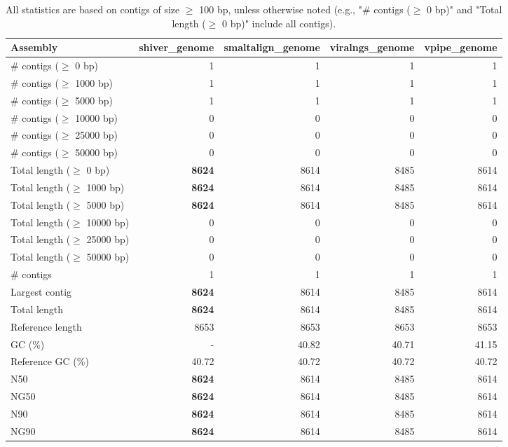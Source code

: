\documentclass[12pt,a4paper]{article}
\begin{document}
\begin{table}[ht]
\begin{center}
\caption{All statistics are based on contigs of size $\geq$ 100 bp, unless otherwise noted (e.g., "\# contigs ($\geq$ 0 bp)" and "Total length ($\geq$ 0 bp)" include all contigs).}
\begin{tabular}{|l*{4}{|r}|}
\hline
Assembly & shiver\_genome & smaltalign\_genome & viralngs\_genome & vpipe\_genome \\ \hline
\# contigs ($\geq$ 0 bp) & 1 & 1 & 1 & 1 \\ \hline
\# contigs ($\geq$ 1000 bp) & 1 & 1 & 1 & 1 \\ \hline
\# contigs ($\geq$ 5000 bp) & 1 & 1 & 1 & 1 \\ \hline
\# contigs ($\geq$ 10000 bp) & 0 & 0 & 0 & 0 \\ \hline
\# contigs ($\geq$ 25000 bp) & 0 & 0 & 0 & 0 \\ \hline
\# contigs ($\geq$ 50000 bp) & 0 & 0 & 0 & 0 \\ \hline
Total length ($\geq$ 0 bp) & {\bf 8624} & 8614 & 8485 & 8614 \\ \hline
Total length ($\geq$ 1000 bp) & {\bf 8624} & 8614 & 8485 & 8614 \\ \hline
Total length ($\geq$ 5000 bp) & {\bf 8624} & 8614 & 8485 & 8614 \\ \hline
Total length ($\geq$ 10000 bp) & 0 & 0 & 0 & 0 \\ \hline
Total length ($\geq$ 25000 bp) & 0 & 0 & 0 & 0 \\ \hline
Total length ($\geq$ 50000 bp) & 0 & 0 & 0 & 0 \\ \hline
\# contigs & 1 & 1 & 1 & 1 \\ \hline
Largest contig & {\bf 8624} & 8614 & 8485 & 8614 \\ \hline
Total length & {\bf 8624} & 8614 & 8485 & 8614 \\ \hline
Reference length & 8653 & 8653 & 8653 & 8653 \\ \hline
GC (\%) & - & 40.82 & 40.71 & 41.15 \\ \hline
Reference GC (\%) & 40.72 & 40.72 & 40.72 & 40.72 \\ \hline
N50 & {\bf 8624} & 8614 & 8485 & 8614 \\ \hline
NG50 & {\bf 8624} & 8614 & 8485 & 8614 \\ \hline
N90 & {\bf 8624} & 8614 & 8485 & 8614 \\ \hline
NG90 & {\bf 8624} & 8614 & 8485 & 8614 \\ \hline

\end{tabular}
\end{center}
\end{table}
\end{document}
